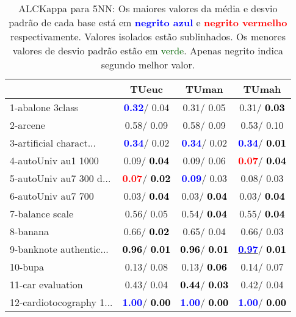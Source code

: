 \begin{table}[h]
\caption{ALCKappa para 5NN: Os maiores valores da média e desvio padrão de cada base está em \textcolor{blue}{\textbf{negrito azul}} e \textcolor{red}{\textbf{negrito vermelho}} respectivamente. Valores isolados estão sublinhados. Os menores valores de desvio padrão estão em \textcolor{darkgreen}{verde}. Apenas negrito indica segundo melhor valor.}
\begin{center}\begin{tabular}{lc|c|c}
 & TUeuc & TUman & TUmah\\ \hline 1-abalone 3class & \textcolor{blue}{\textbf{  0.32}}/  0.04 &   0.31/  0.05 &   0.31/\textcolor{black}{\textbf{  0.03}} \\
2-arcene &   0.58/  0.09 &   0.58/  0.09 &   0.53/  0.10 \\
3-artificial charact... & \textcolor{blue}{\textbf{  0.34}}/  0.02 & \textcolor{blue}{\textbf{  0.34}}/  0.02 & \textcolor{blue}{\textbf{  0.34}}/\textcolor{black}{\textbf{  0.01}} \\
4-autoUniv au1 1000 &   0.09/\textcolor{black}{\textbf{  0.04}} &   0.09/  0.06 & \textcolor{red}{\textbf{  0.07}}/\textcolor{black}{\textbf{  0.04}} \\
5-autoUniv au7 300 d... & \textcolor{red}{\textbf{  0.07}}/\textcolor{black}{\textbf{  0.02}} & \textcolor{blue}{\textbf{  0.09}}/  0.03 &   0.08/  0.03 \\
6-autoUniv au7 700 &   0.03/\textcolor{black}{\textbf{  0.04}} &   0.03/\textcolor{black}{\textbf{  0.04}} &   0.03/\textcolor{black}{\textbf{  0.04}} \\
7-balance scale &   0.56/  0.05 &   0.54/\textcolor{black}{\textbf{  0.04}} &   0.55/\textcolor{black}{\textbf{  0.04}} \\ \hline
8-banana &   0.66/\textcolor{black}{\textbf{  0.02}} &   0.65/  0.04 &   0.66/  0.03 \\
9-banknote authentic... & \textcolor{black}{\textbf{  0.96}}/\textcolor{black}{\textbf{  0.01}} & \textcolor{black}{\textbf{  0.96}}/\textcolor{black}{\textbf{  0.01}} & \underline{\textcolor{blue}{\textbf{  0.97}}}/\textcolor{black}{\textbf{  0.01}} \\
10-bupa &   0.13/  0.08 &   0.13/\textcolor{black}{\textbf{  0.06}} &   0.14/  0.07 \\
11-car evaluation &   0.43/  0.04 & \textcolor{black}{\textbf{  0.44}}/\textcolor{black}{\textbf{  0.03}} &   0.42/  0.04 \\
12-cardiotocography 1... & \textcolor{blue}{\textbf{  1.00}}/\textcolor{black}{\textbf{  0.00}} & \textcolor{blue}{\textbf{  1.00}}/\textcolor{black}{\textbf{  0.00}} & \textcolor{blue}{\textbf{  1.00}}/\textcolor{black}{\textbf{  0.00}} \\

\end{tabular}
\end{center}
\end{table}
